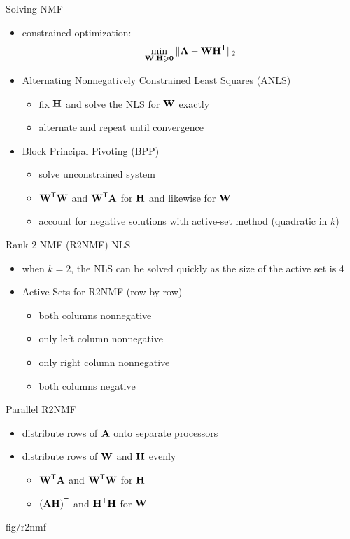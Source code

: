 \documentclass{beamer}
\begin{document}
\begin{frame}{Solving NMF}
    \begin{itemize}
        \item constrained optimization: $$\min_{\M{W},\M{H}\geq \M{0}} \|\M{A} - \M{W}\M{H}^\Tra\|_2$$
        \item Alternating Nonnegatively Constrained Least Squares (ANLS)
        \begin{itemize}
            \item fix $\M{H}$ and solve the NLS for $\M{W}$ exactly
            \item alternate and repeat until convergence
        \end{itemize}

        \item Block Principal Pivoting (BPP)
        \begin{itemize}
            \item solve unconstrained system
            \item $\M{W}^\Tra\M{W}$ and $\M{W}^\Tra\M{A}$ for $\M{H}$ and likewise for $\M{W}$
            \item account for negative solutions with active-set method (quadratic in $k$)
        \end{itemize}
    \end{itemize}
\end{frame}

\begin{frame}{Rank-2 NMF (R2NMF) NLS}
    \begin{itemize}
        \item when $k = 2$, the NLS can be solved quickly as the size of the active set is 4
        \item Active Sets for R2NMF (row by row)
        \begin{itemize}
            \item both columns nonnegative
            \item only left column nonnegative
            \item only right column nonnegative
            \item both columns negative
        \end{itemize}
    \end{itemize}
\end{frame}

\begin{frame}{Parallel R2NMF}
    \begin{itemize}
        \item distribute rows of $\M{A}$ onto separate processors
        \item distribute rows of $\M{W}$ and $\M{H}$ evenly
        \begin{itemize}
            \item $\M{W}^\Tra\M{A}$ and $\M{W}^\Tra\M{W}$ for $\M{H}$
            \item $(\M{A}\M{H})^\Tra$ and $\M{H}^\Tra\M{H}$ for $\M{W}$
        \end{itemize}
    \end{itemize}
        {fig/r2nmf}
\end{frame}
\end{document}
